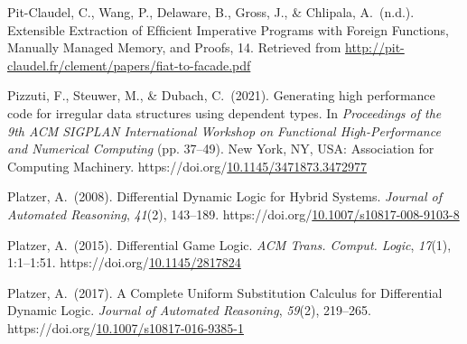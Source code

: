 \documentclass[12pt,twoside]{article}
\begin{document}
{\begin{thebibliography}{1079}
\mdbibitemlabel{}Pit-Claudel, C., Wang, P., Delaware, B., Gross, J., \& Chlipala, A.~(n.d.). Extensible Extraction of Efﬁcient Imperative Programs with Foreign Functions, Manually Managed Memory, and Proofs, 14. Retrieved from \href{http://pit-claudel.fr/clement/papers/fiat-to-facade.pdf}{{\ttfamily http://\hspace{0pt}pit-\hspace{0pt}claudel.\hspace{0pt}fr/\hspace{0pt}clement/\hspace{0pt}papers/\hspace{0pt}fiat-\hspace{0pt}to-\hspace{0pt}facade.\hspace{0pt}pdf}}%

\mdbibitemlabel{}Pizzuti, F., Steuwer, M., \& Dubach, C.~(2021). Generating high performance code for irregular data structures using dependent types. In \emph{Proceedings of the 9th ACM SIGPLAN International Workshop on Functional High-Performance and Numerical Computing} (pp. 37–49). New York, NY, USA: Association for Computing Machinery. https://doi.org/\href{https://dx.doi.org/10.1145/3471873.3472977}{10.1145/3471873.3472977}%

\mdbibitemlabel{}Platzer, A.~(2008). Differential Dynamic Logic for Hybrid Systems. \emph{Journal of Automated Reasoning}, \emph{41}(2), 143–189. https://doi.org/\href{https://dx.doi.org/10.1007/s10817-008-9103-8}{10.1007/s10817-008-9103-8}%

\mdbibitemlabel{}Platzer, A.~(2015). Differential Game Logic. \emph{ACM Trans. Comput. Logic}, \emph{17}(1), 1:1–1:51. https://doi.org/\href{https://dx.doi.org/10.1145/2817824}{10.1145/2817824}%

\mdbibitemlabel{}Platzer, A.~(2017). A Complete Uniform Substitution Calculus for Differential Dynamic Logic. \emph{Journal of Automated Reasoning}, \emph{59}(2), 219–265. https://doi.org/\href{https://dx.doi.org/10.1007/s10817-016-9385-1}{10.1007/s10817-016-9385-1}%


\end{thebibliography}}
\end{document}
